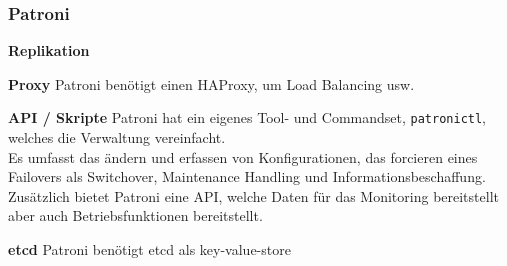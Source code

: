 
\subsubsection{Patroni}
\begin{flushleft}
    
\end{flushleft}
\begin{flushleft}
    \textbf{Replikation}

\end{flushleft}
\begin{flushleft}
    \textbf{Proxy}
    Patroni benötigt einen \Gls{HAProxy}, um Load Balancing usw. \cite{VYXTI7BS}
\end{flushleft}
\begin{flushleft}
    \textbf{API / Skripte}
    Patroni hat ein eigenes Tool- und Commandset, \texttt{patronictl}, welches die Verwaltung vereinfacht.\\
    Es umfasst das ändern und erfassen von Konfigurationen, das forcieren eines Failovers als Switchover, Maintenance Handling und Informationsbeschaffung.\\

    Zusätzlich bietet Patroni eine API, welche Daten für das Monitoring bereitstellt aber auch Betriebsfunktionen bereitstellt.\\
\end{flushleft}
\begin{flushleft}
    \textbf{\gls{etcd}}
    Patroni benötigt etcd als key-value-store
\end{flushleft}